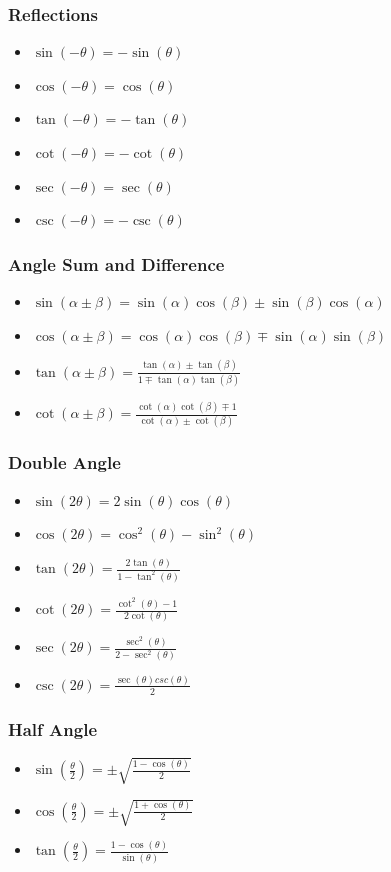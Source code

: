 \documentclass[a4paper, 15pt]{article}
\begin{document}
			\subsubsection{Reflections}
				\begin{itemize}
					\item $\sin(-\theta) = -\sin(\theta)$
					\item $\cos(-\theta) = \cos(\theta)$
					\item $\tan(-\theta) = -\tan(\theta)$
					\item $\cot(-\theta) = -\cot(\theta)$
					\item $\sec(-\theta) = \sec(\theta)$
					\item $\csc(-\theta) =  -\csc(\theta)$ 
				\end{itemize}

			\subsubsection{Angle Sum and Difference}
				\begin{itemize}
					\item $\sin(\alpha \pm \beta) = \sin(\alpha)\cos(\beta) \pm \sin(\beta)\cos(\alpha)$
					\item $\cos(\alpha \pm \beta) = \cos(\alpha)\cos(\beta) \mp \sin(\alpha)\sin(\beta)$
					\item $\tan(\alpha \pm \beta) = \frac{\tan(\alpha) \pm \tan(\beta)}{1 \mp \tan(\alpha)\tan(\beta)}$ 
					\item $\cot(\alpha \pm \beta) = \frac{\cot(\alpha)\cot(\beta) \mp 1}{\cot(\alpha) \pm \cot(\beta)}$
				\end{itemize}

			\subsubsection{Double Angle}
				\begin{itemize}
					\item $\sin(2\theta) = 2\sin(\theta)\cos(\theta)$
					\item $\cos(2\theta) = \cos^2(\theta) - \sin^2(\theta)$
					\item $\tan(2\theta) = \frac{2\tan(\theta)}{1-\tan^2(\theta)}$
					\item $\cot(2\theta) = \frac{\cot^2(\theta) - 1}{2\cot(\theta)}$
					\item $\sec(2\theta) = \frac{\sec^2(\theta)}{2-\sec^2(\theta)}$
					\item $\csc(2\theta) = \frac{\sec(\theta)csc(\theta)}{2}$
				\end{itemize}
			\subsubsection{Half Angle}
				\begin{itemize}
					\item $\sin(\frac{\theta}{2}) = \pm \sqrt{\frac{1-\cos(\theta)}{2}}$
					\item $\cos(\frac{\theta}{2}) = \pm  \sqrt{\frac{1+\cos(\theta)}{2}}$
					\item $\tan(\frac{\theta}{2}) = \frac{1-\cos(\theta)}{\sin(\theta)}$
				\end{itemize}	
\end{document}
